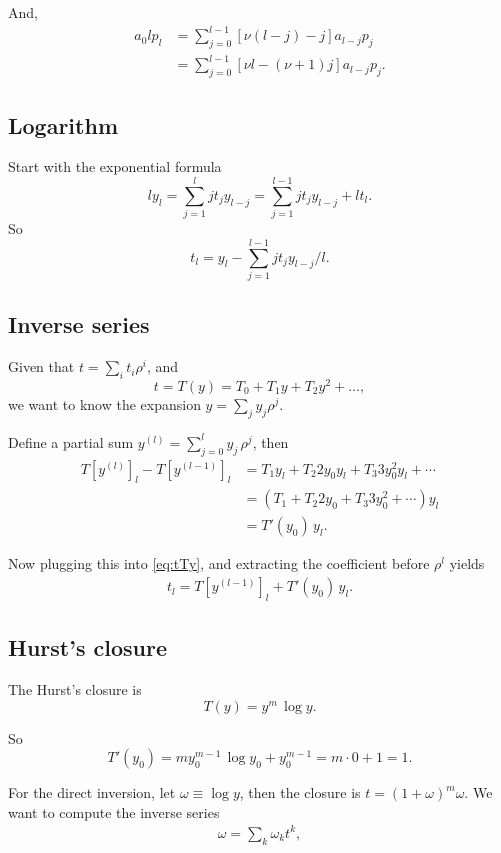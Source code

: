 \documentclass[aip,jcp,reprint,superscriptaddress]{revtex4-1}
\numberwithin{equation}{subsection}
\begin{document}
And,
\begin{align*}
  a_0 l p_l
&=
  \sum_{j = 0}^{l-1} [ \nu (l - j) - j] a_{l - j} p_j
\\
&=
  \sum_{j = 0}^{l-1} [ \nu l - (\nu + 1) j] a_{l - j} p_j.
\end{align*}


\subsection{Logarithm}

Start with the exponential formula
\[
  l y_l = \sum_{j = 1}^l j t_j y_{l - j}
  = \sum_{j = 1}^{l - 1} j t_j y_{l - j} + l t_l.
\]
So
\[
  t_l = y_l - \sum_{j = 1}^{l-1} j t_j y_{l - j}/l.
\]


\subsection{Inverse series}

Given that $t = \sum_i t_i \rho^i$, and
\begin{equation}
  t = T(y) = T_0 + T_1 y + T_2 y^2 + \dots,
  \label{eq:tTy}
\end{equation}
we want to know the expansion $y = \sum_j y_j \rho^j$.


Define a partial sum $y^{(l)} = \sum_{j=0}^l y_j \, \rho^j$,
then
\begin{align*}
  T[y^{(l)}]_l - T[y^{(l-1)}]_l
&=
  T_1 y_l
+ T_2 2 y_0 y_l
+ T_3 3 y_0^2 y_l
+ \cdots
\\
&=
  (T_1
+ T_2 2 y_0
+ T_3 3 y_0^2
+ \cdots) y_l
\\
&= T'(y_0) \, y_l.
\end{align*}

Now plugging this into \eqref{eq:tTy},
and extracting the coefficient before $\rho^l$
yields
\begin{align*}
  t_l = T[y^{(l-1)}]_l + T'(y_0) \, y_l.
\end{align*}



\subsection{Hurst's closure}

The Hurst's closure is
\[
  T(y) = y^m \, \log y.
\]

So
\[
  T'(y_0)
  = m y_0^{m -1} \, \log y_0 + y_0^{m - 1}
  = m \cdot 0 + 1 = 1.
\]

For the direct inversion,
let $\omega \equiv \log y$,
then the closure is $t = (1+\omega)^m \omega$.
%
We want to compute the inverse series
\begin{align*}
  \omega = \sum_k \omega_k t^k,
\end{align*}
\end{document}
